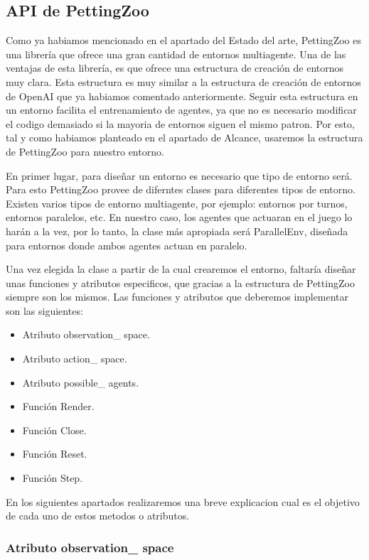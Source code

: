 \subsection{API de PettingZoo}

Como ya habiamos mencionado en el apartado del Estado del arte, PettingZoo es una librería que ofrece una gran cantidad de entornos multiagente. Una de las ventajas de esta librería, es que ofrece una estructura de creación de entornos muy clara. Esta estructura es muy similar a la estructura de creación de entornos de OpenAI que ya habiamos comentado anteriormente. Seguir esta estructura en un entorno facilita el entrenamiento de agentes, ya que no es necesario modificar el codigo demasiado si la mayoria de entornos siguen el mismo patron. Por esto, tal y como habiamos planteado en el apartado de Alcance, usaremos la estructura de PettingZoo para nuestro entorno.

En primer lugar, para diseñar un entorno es necesario que tipo de entorno será. Para esto PettingZoo provee de diferntes clases para diferentes tipos de entorno. Existen varios tipos de entorno multiagente, por ejemplo: entornos por turnos, entornos paralelos, etc. En nuestro caso, los agentes que actuaran en el juego lo harán a la vez, por lo tanto, la clase más apropiada será ParallelEnv, diseñada para entornos donde ambos agentes actuan en paralelo.

Una vez elegida la clase a partir de la cual crearemos el entorno, faltaría diseñar unas funciones y atributos especificos, que gracias a la estructura de PettingZoo siempre son los mismos. Las funciones y atributos que deberemos implementar son las siguientes:

\begin{itemize}
    \item Atributo observation\_ space.
    \item Atributo action\_ space.
    \item Atributo possible\_ agents.
    \item Función Render.
    \item Función Close.
    \item Función Reset.
    \item Función Step.
\end{itemize}

En los siguientes apartados realizaremos una breve explicacion cual es el objetivo de cada uno de estos metodos o atributos.

\subsubsection*{Atributo observation\_ space}

